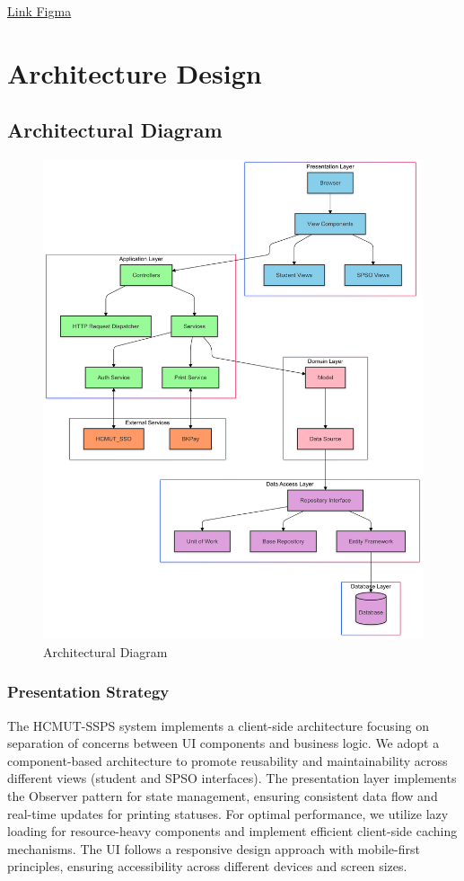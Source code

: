 \documentclass[a4paper]{report}
\begin{document}
\href{}{Link Figma}

\newpage
\chapter{Architecture Design}

\section{Architectural Diagram}

\begin{figure}[H]
    \centering
    \includegraphics[width=0.78\linewidth]{images/architectural_diagram.png}
    \caption{Architectural Diagram}
    \label{fig:enter-label}
\end{figure}

\subsection{Presentation Strategy} 

The HCMUT-SSPS system implements a client-side architecture focusing on separation of concerns between UI components and business logic. We adopt a component-based architecture to promote reusability and maintainability across different views (student and SPSO interfaces). The presentation layer implements the Observer pattern for state management, ensuring consistent data flow and real-time updates for printing statuses. For optimal performance, we utilize lazy loading for resource-heavy components and implement efficient client-side caching mechanisms. The UI follows a responsive design approach with mobile-first principles, ensuring accessibility across different devices and screen sizes.
\end{document}
